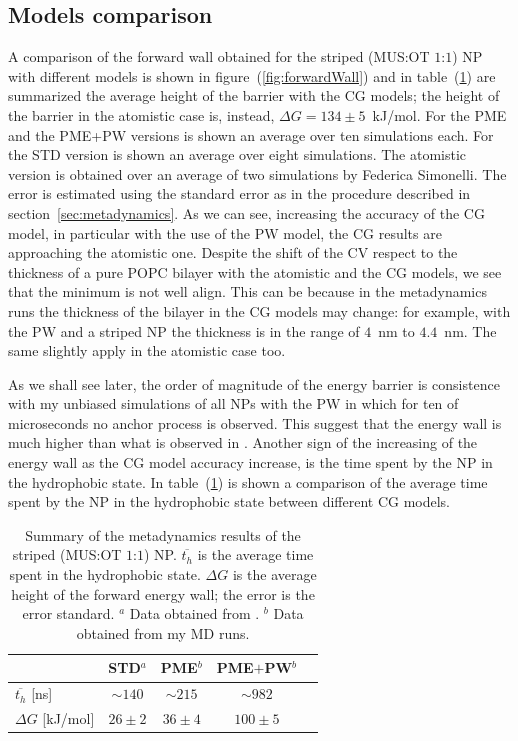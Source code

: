 \subsection{Models comparison}
A comparison of the forward wall obtained for the striped (\ac{MUS}:\ac{OT} $1$:$1$) \ac{NP} with different models is shown in figure~(\ref{fig:forwardWall}) and in table~(\ref{tab:hydroTime}) are summarized the average height of the barrier with the \ac{CG} models; the height of the barrier in the atomistic case is, instead, $\Delta G = 134 \pm 5$~kJ/mol. For the \ac{PME} and the \ac{PME}+\ac{PW} versions is shown an average over ten simulations each. For the STD version is shown an average over eight simulations. The atomistic version is obtained over an average of two simulations by Federica Simonelli. The error is estimated using the standard error as in the procedure described in section~\ref{sec:metadynamics}. As we can see, increasing the accuracy of the \ac{CG} model, in particular with the use of the \ac{PW} model, the \ac{CG} results are approaching the atomistic one. Despite the shift of the \ac{CV} respect to the thickness of a pure \ac{POPC} bilayer with the atomistic and the \ac{CG} models, we see that the minimum is not well align. This can be because in the metadynamics runs the thickness of the bilayer in the \ac{CG} models may change: for example, with the \ac{PW} and a striped \ac{NP} the thickness is in the range of $4$~nm to $4.4$~nm. The same slightly apply in the atomistic case too.

As we shall see later, the order of magnitude of the energy barrier is consistence with my unbiased simulations of all \acp{NP} with the \ac{PW} in which for ten of microseconds no anchor process is observed. This suggest that the energy wall is much higher than what is observed in \cite{ourPaper}. Another sign of the increasing of the energy wall as the \ac{CG} model accuracy increase, is the time spent by the \ac{NP} in the hydrophobic state. In table~(\ref{tab:hydroTime}) is shown a comparison of the average time spent by the \ac{NP} in the hydrophobic state between different \ac{CG} models.
\begin{table}[h!t]
	\centering
	\begin{tabular}{lcccc}
		\toprule
		\,					& STD$^a$	& \acs{PME}$^b$	& \acs{PME}$+$\acs{PW}$^b$  \\ \toprule
	$\overline{t_{h}}$ [ns]	& $\sim 140$& $\sim 215$	& $\sim 982$			 	\\ \midrule
	$\Delta G$ [kJ/mol] 	& $26 \pm 2$& $36 \pm 4$	& $100 \pm 5$				\\ \bottomrule
	\end{tabular}
	\caption{Summary of the metadynamics results of the striped (\acs{MUS}:\acs{OT} $1$:$1$) \acs{NP}. $\overline{t_h}$ is the average time spent in the hydrophobic state. $\Delta G$ is the average height of the forward energy wall; the error is the error standard. \footnotesize $^a$ Data obtained from \cite{ourPaper}. $^b$ Data obtained from my \acs{MD} runs.}
	\label{tab:hydroTime}
\end{table}

